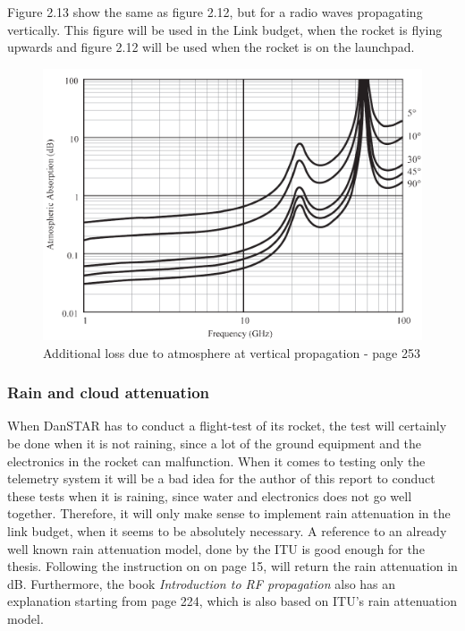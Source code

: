 Figure 2.13 show the same as figure 2.12, but for a radio waves propagating vertically. This figure will be used in the Link budget, when the rocket is flying upwards and figure 2.12 will be used when the rocket is on the launchpad.

\begin{figure}[H]
\hspace{-3cm}
\includegraphics[scale=0.7]{figures/AbsorbsAtmosphereVertical.PNG}
\caption{Additional loss due to atmosphere at vertical propagation\cite{RFpropagation} - page 253}
\end{figure}

\newpage

\subsubsection{Rain and cloud attenuation}
When DanSTAR has to conduct a flight-test of its rocket, the test will certainly be done when it is not raining, since a lot of the ground equipment and the electronics in the rocket can malfunction. When it comes to testing only the telemetry system it will be a bad idea for the author of this report to conduct these tests when it is raining, since water and electronics does not go well together. Therefore, it will only make sense to implement rain attenuation in the link budget, when it seems to be absolutely necessary. A reference to an already well known rain attenuation model, done by the ITU is good enough for the thesis. Following the instruction on \cite{ITURain} on page 15, will return the rain attenuation in dB. Furthermore, the book \textit{Introduction to RF propagation} also has an explanation starting from page 224, which is also based on ITU's rain attenuation model.


